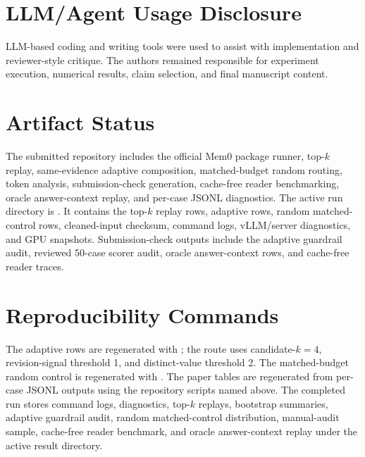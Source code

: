 \documentclass{article}
\begin{document}
\section*{LLM/Agent Usage Disclosure}

LLM-based coding and writing tools were used to assist with implementation and reviewer-style critique. The authors remained responsible for experiment execution, numerical results, claim selection, and final manuscript content.

\section*{Artifact Status}

The submitted repository includes the official Mem0 package runner, top-$k$ replay, same-evidence adaptive composition, matched-budget random routing, token analysis, submission-check generation, cache-free reader benchmarking, oracle answer-context replay, and per-case JSONL diagnostics. The active run directory is . It contains the top-$k$ replay rows, adaptive rows, random matched-control rows, cleaned-input checksum, command logs, vLLM/server diagnostics, and GPU snapshots. Submission-check outputs include the adaptive guardrail audit, reviewed 50-case scorer audit, oracle answer-context rows, and cache-free reader traces.

\section*{Reproducibility Commands}

The adaptive rows are regenerated with ; the route uses candidate-$k=4$, revision-signal threshold 1, and distinct-value threshold 2. The matched-budget random control is regenerated with . The paper tables are regenerated from per-case JSONL outputs using the repository scripts named above. The completed run stores command logs, diagnostics, top-$k$ replays, bootstrap summaries, adaptive guardrail audit, random matched-control distribution, manual-audit sample, cache-free reader benchmark, and oracle answer-context replay under the active result directory.

\FloatBarrier


\end{document}
